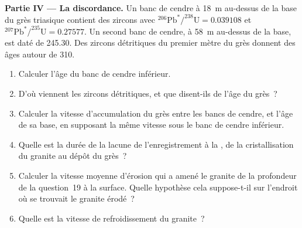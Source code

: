 \begin{problem}
\noindent\textbf{Partie IV --- La discordance.} Un banc de cendre à \qty{18}{m} au-dessus de la
base du grès triasique contient des zircons avec
$^{206}\mathrm{Pb}^*/^{238}\mathrm{U} = 0.039108$ et
$^{207}\mathrm{Pb}^*/^{235}\mathrm{U} = 0.27577$. Un second banc de cendre, à \qty{58}{m}
au-dessus de la base, est daté de \qty{245.30}{\Ma}. Des zircons détritiques du premier mètre
du grès donnent des âges autour de \qty{310}{\Ma}.
\begin{enumerate}[resume]
  \item Calculer l'âge du banc de cendre inférieur.
  \item D'où viennent les zircons détritiques, et que disent-ils de
        l'âge du grès~?
  \item Calculer la vitesse d'accumulation du grès entre les bancs de cendre,
        et l'âge de sa base, en supposant la même vitesse sous le banc de cendre inférieur.
  \item Quelle est la durée de la lacune de l'enregistrement à la , de la
        cristallisation du granite au dépôt du grès~?
  \item Calculer la vitesse moyenne d'érosion qui a amené le granite de la profondeur
        de la question~19 à la surface. Quelle hypothèse cela suppose-t-il sur l'endroit où se trouvait
        le granite érodé~?
  \item Quelle est la vitesse de refroidissement du granite~?
\end{enumerate}
\end{problem}
